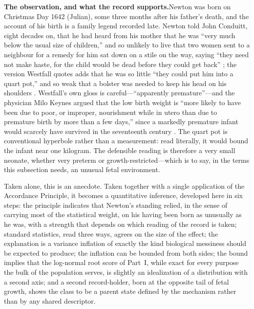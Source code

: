 \documentclass{article}
\begin{document}
\par\medskip\noindent\textbf{The observation, and what the record supports.}\enspace Newton was born on Christmas Day 1642 (Julian), some three months after his father's death, and the account of his birth is a family legend recorded late. Newton told John Conduitt, eight decades on, that he had heard from his mother that he was ``very much below the usual size of children,'' and so unlikely to live that two women sent to a neighbour for a remedy for him sat down on a stile on the way, saying ``they need not make haste, for the child would be dead before they could get back'' \cite{conduitt1727memoranda}; the version Westfall quotes adds that he was so little ``they could put him into a quart pot,'' and so weak that a bolster was needed to keep his head on his shoulders \cite{westfall1980never}. Westfall's own gloss is careful---``apparently premature''---and the physician Milo Keynes argued that the low birth weight is ``more likely to have been due to poor, or improper, nourishment while in utero than due to premature birth by more than a few days,'' since a markedly premature infant would scarcely have survived in the seventeenth century \cite{keynes1995personality}. The quart pot is conventional hyperbole rather than a measurement: read literally, it would bound the infant near one kilogram. The defensible reading is therefore a very small neonate, whether very preterm or growth-restricted---which is to say, in the terms this subsection needs, an unusual fetal environment.

Taken alone, this is an anecdote. Taken together with a single application of the Accordance Principle, it becomes a quantitative inference, developed here in six steps: the principle indicates that Newton's standing relied, in the sense of carrying most of the statistical weight, on his having been born as unusually as he was, with a strength that depends on which reading of the record is taken; standard statistics, read three ways, agrees on the size of the effect; the explanation is a variance inflation of exactly the kind biological messiness should be expected to produce; the inflation can be bounded from both sides; the bound implies that the log-normal root score of Part~I, while exact for every purpose the bulk of the population serves, is slightly an idealization of a distribution with a second axis; and a second record-holder, born at the opposite tail of fetal growth, shows the class to be a parent state defined by the mechanism rather than by any shared descriptor.
\end{document}
